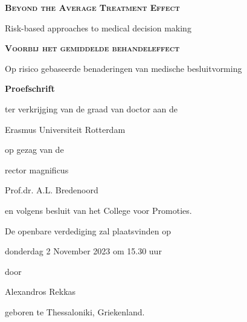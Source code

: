 \begin{center}
\textbf{\textsc{Beyond the Average Treatment Effect}}\par
Risk-based approaches to medical decision making \par

\vspace*{0.6cm}

\textbf{\textsc{Voorbij het gemiddelde behandeleffect}}\par
Op risico gebaseerde benaderingen van medische besluitvorming \par

\vspace*{1cm}

\textbf{Proefschrift} \par

\vspace*{1cm}

ter verkrijging van de graad van doctor aan de\par
Erasmus Universiteit Rotterdam \par
op gezag van de \par
rector magnificus \par

\vspace*{0.8cm}

Prof.dr. A.L. Bredenoord\par

\vspace*{0.8cm}

en volgens besluit van het College voor Promoties. \par
De openbare verdediging zal plaatsvinden op  \par

\vspace*{0.4cm}

donderdag 2 November 2023 om 15.30 uur \par

\vspace*{0.4cm}

door \par

\vspace*{0.4cm}

Alexandros Rekkas \par

\vspace*{0.4cm}

geboren te Thessaloniki, Griekenland.

\end{center}


